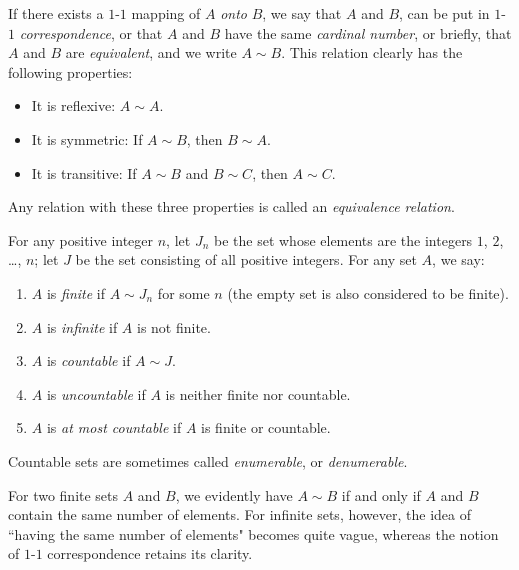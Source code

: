 \begin{definition}
    If there exists a \(1\)-\(1\) mapping of \(A\) \emph{onto} \(B\), we say that \(A\) and \(B\), can be put in \(1\)-\(1\) \emph{correspondence}, or that \(A\) and \(B\) have the same \emph{cardinal number}, or briefly, that \(A\) and \(B\) are \emph{equivalent}, and we write \(A\sim B\). This relation clearly has the following properties:
    \begin{itemize}
        \item It is reflexive: \(A\sim A\).
        \item It is symmetric: If \(A\sim B\), then \(B\sim A\).
        \item It is transitive: If \(A\sim B\) and \(B\sim C\), then \(A\sim C\).
    \end{itemize}
    Any relation with these three properties is called an \emph{equivalence relation}.
\end{definition}

\begin{definition}\label{definition:2.4}
    For any positive integer \(n\), let \(J_n\) be the set whose elements are the integers \(1\), \(2\), \ldots, \(n\); let \(J\) be the set consisting of all positive integers. For any set \(A\), we say:
    \begin{enumerate}
        \item \(A\) is \emph{finite} if \(A\sim J_n\) for some \(n\) (the empty set is also considered to be finite).
        \item\label{itm:2.2} \(A\) is \emph{infinite} if \(A\) is not finite.
        \item \(A\) is \emph{countable} if \(A\sim J\).
        \item \(A\) is \emph{uncountable} if \(A\) is neither finite nor countable.
        \item \(A\) is \emph{at most countable} if \(A\) is finite or countable.
    \end{enumerate}
\end{definition}

Countable sets are sometimes called \emph{enumerable}, or \emph{denumerable}.

For two finite sets \(A\) and \(B\), we evidently have \(A\sim B\) if and only if \(A\) and \(B\) contain the same number of elements. For infinite sets, however, the idea of ``having the same number of elements" becomes quite vague, whereas the notion of \(1\)-\(1\) correspondence retains its clarity.

